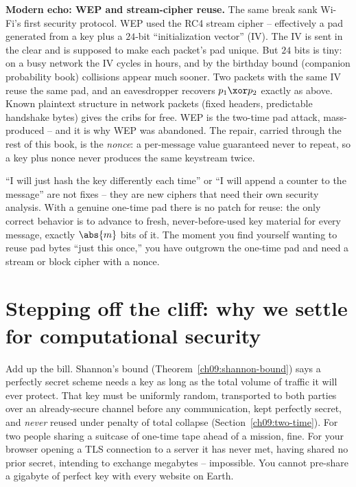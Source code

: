 \begin{attackbox}
\textbf{Modern echo: WEP and stream-cipher reuse.} The same break sank Wi-Fi's first security protocol. WEP used the RC4 stream cipher -- effectively a pad generated from a key plus a $24$-bit ``initialization vector'' (IV). The IV is sent in the clear and is supposed to make each packet's pad unique. But $24$ bits is tiny: on a busy network the IV cycles in hours, and by the birthday bound (companion probability book) collisions appear much sooner. Two packets with the same IV reuse the same pad, and an eavesdropper recovers $p_1 \xor p_2$ exactly as above. Known plaintext structure in network packets (fixed headers, predictable handshake bytes) gives the cribs for free. WEP is the two-time pad attack, mass-produced -- and it is why WEP was abandoned. The repair, carried through the rest of this book, is the \emph{nonce}: a per-message value guaranteed never to repeat, so a key plus nonce never produces the same keystream twice.
\end{attackbox}

\begin{trapbox}
``I will just hash the key differently each time'' or ``I will append a counter to the message'' are not fixes -- they are new ciphers that need their own security analysis. With a genuine one-time pad there is no patch for reuse: the only correct behavior is to advance to fresh, never-before-used key material for every message, exactly $\abs{m}$ bits of it. The moment you find yourself wanting to reuse pad bytes ``just this once,'' you have outgrown the one-time pad and need a stream or block cipher with a nonce.
\end{trapbox}

\section{Stepping off the cliff: why we settle for computational security}
\label{ch09:computational}

Add up the bill. Shannon's bound (Theorem~\ref{ch09:shannon-bound}) says a perfectly secret scheme needs a key as long as the total volume of traffic it will ever protect. That key must be uniformly random, transported to both parties over an already-secure channel before any communication, kept perfectly secret, and \emph{never} reused under penalty of total collapse (Section~\ref{ch09:two-time}). For two people sharing a suitcase of one-time tape ahead of a mission, fine. For your browser opening a TLS connection to a server it has never met, having shared no prior secret, intending to exchange megabytes -- impossible. You cannot pre-share a gigabyte of perfect key with every website on Earth.


